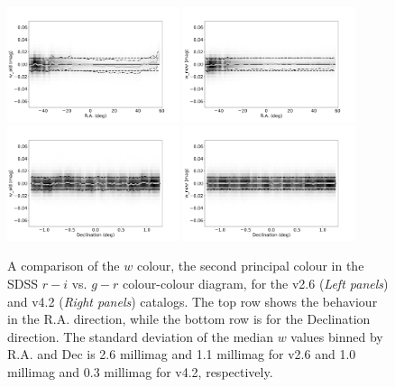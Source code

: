 \documentclass[fleqn,usenatbib]{mnras}
\begin{document}
\begin{figure}
    \centering\includegraphics[width=0.45\textwidth]{figures/testV26vsV42_r_w_old_RA_Hess.png}
    \centering\includegraphics[width=0.45\textwidth]{figures/testV26vsV42_r_w_new_RA_Hess.png}
    \centering\includegraphics[width=0.45\textwidth]{figures/testV26vsV42_r_w_old_Dec_Hess.png}
    \centering\includegraphics[width=0.45\textwidth]{figures/testV26vsV42_r_w_new_Dec_Hess.png}
\caption{A comparison of the $w$ colour, the second principal colour in the SDSS
$r-i$ vs. $g-r$ colour-colour diagram, for the v2.6 ({\it Left panels}) and v4.2 ({\it Right panels})
catalogs. The top row shows the behaviour in the R.A. direction, while the bottom row is for the Declination direction. The standard deviation of the median $w$ values binned by R.A. and Dec
is 2.6 millimag and 1.1 millimag for v2.6 and 1.0 millimag and 0.3 millimag for v4.2,
respectively.}
\label{fig:comparew} 
\end{figure}
 
\end{document}
